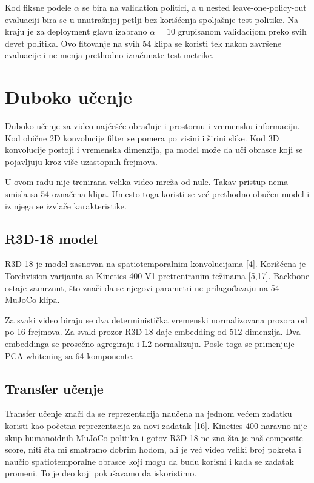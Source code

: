 ﻿\documentclass[12pt,a4paper]{report}
\begin{document}
Kod fiksne podele $\alpha$ se bira na validation politici, a u nested
leave-one-policy-out evaluaciji bira se u unutrašnjoj petlji bez korišćenja
spoljašnje test politike. Na kraju je za deployment glavu izabrano
$\alpha=10$ grupisanom validacijom preko svih devet politika. Ovo fitovanje na
svih 54 klipa se koristi tek nakon završene evaluacije i ne menja prethodno
izračunate test metrike.

\section{Duboko učenje}

Duboko učenje za video najčešće obrađuje i prostornu i vremensku informaciju.
Kod obične 2D konvolucije filter se pomera po visini i širini slike. Kod 3D
konvolucije postoji i vremenska dimenzija, pa model može da uči obrasce koji se
pojavljuju kroz više uzastopnih frejmova.

U ovom radu nije trenirana velika video mreža od nule. Takav pristup nema
smisla sa 54 označena klipa. Umesto toga koristi se već prethodno obučen model i
iz njega se izvlače karakteristike.

\subsection{R3D-18 model}

R3D-18 je model zasnovan na spatiotemporalnim konvolucijama [4]. Korišćena je
Torchvision varijanta sa Kinetics-400 V1 pretreniranim težinama [5,17]. Backbone
ostaje zamrznut, što znači da se njegovi parametri ne prilagođavaju na 54
MuJoCo klipa.

Za svaki video biraju se dva deterministička vremenski normalizovana prozora od
po 16 frejmova. Za svaki prozor R3D-18 daje embedding od 512 dimenzija. Dva
embeddinga se prosečno agregiraju i L2-normalizuju. Posle toga se primenjuje PCA
whitening sa 64 komponente.

\subsection{Transfer učenje}

Transfer učenje znači da se reprezentacija naučena na jednom većem zadatku
koristi kao početna reprezentacija za novi zadatak [16]. Kinetics-400 naravno nije
skup humanoidnih MuJoCo politika i gotov R3D-18 ne zna šta je naš composite
score, niti šta mi smatramo dobrim hodom, ali je već video veliki broj pokreta i
naučio spatiotemporalne obrasce koji mogu da budu korisni i kada se zadatak
promeni. To je deo koji pokušavamo da iskoristimo.
\end{document}
